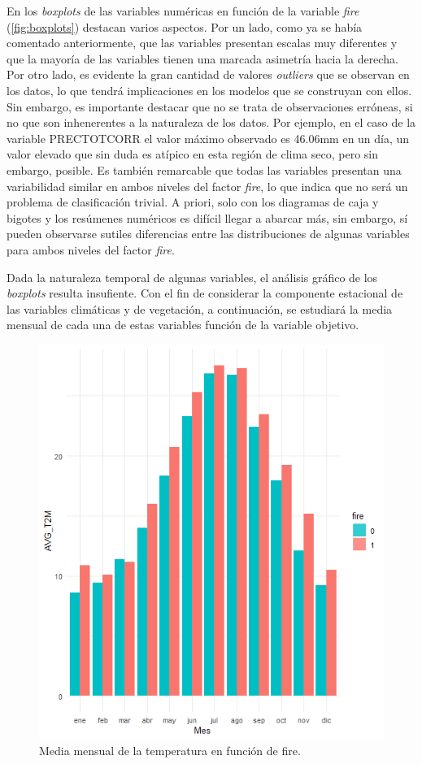 \documentclass[12pt,a4paper,]{book}
\numberwithin{dummy}{section}
\theoremstyle{ocrenumbox}
\theoremstyle{blacknumex}
\theoremstyle{blacknumbox}
\theoremstyle{ocrenum}
\theoremstyle{ocrenum}
\begin{document}
En los \emph{boxplots} de las variables numéricas en función de la
variable \emph{fire} (\ref{fig:boxplots}) destacan varios aspectos. Por
un lado, como ya se había comentado anteriormente, que las variables
presentan escalas muy diferentes y que la mayoría de las variables
tienen una marcada asimetría hacia la derecha. Por otro lado, es
evidente la gran cantidad de valores \emph{outliers} que se observan en
los datos, lo que tendrá implicaciones en los modelos que se construyan
con ellos. Sin embargo, es importante destacar que no se trata de
observaciones erróneas, si no que son inhenerentes a la naturaleza de
los datos. Por ejemplo, en el caso de la variable PRECTOTCORR el valor
máximo observado es 46.06mm en un día, un valor elevado que sin duda es
atípico en esta región de clima seco, pero sin embargo, posible. Es
también remarcable que todas las variables presentan una variabilidad
similar en ambos niveles del factor \emph{fire}, lo que indica que no
será un problema de clasificación trivial. A priori, solo con los
diagramas de caja y bigotes y los resúmenes numéricos es difícil llegar
a abarcar más, sin embargo, sí pueden observarse sutiles diferencias
entre las distribuciones de algunas variables para ambos niveles del
factor \emph{fire}.

Dada la naturaleza temporal de algunas variables, el análisis gráfico de
los \emph{boxplots} resulta insufiente. Con el fin de considerar la
componente estacional de las variables climáticas y de vegetación, a
continuación, se estudiará la media mensual de cada una de estas
variables función de la variable objetivo.

\begin{figure}[h]
\centering
\includegraphics[width = \textwidth]{graficos/T2M_mes.png}
\caption{Media mensual de la temperatura en función de fire.}
\label{fig:T2M_mes}
\end{figure}
\end{document}

